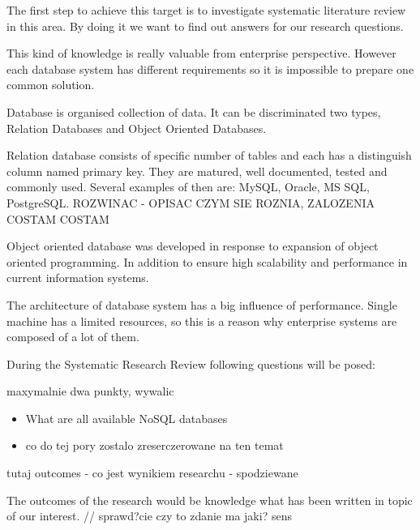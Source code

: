 \documentclass[times, 10pt,twocolumn]{article}
\begin{document}
The first step to achieve this target is to investigate systematic literature review in this area.
By doing it we want to find out answers for our research questions.

This kind of knowledge is really valuable from enterprise perspective. However each database
system has different requirements so it is impossible to prepare one common solution.
 

Database is organised collection of data. It can be discriminated two types, 
Relation Databases and Object Oriented Databases.

Relation database consists of specific number of tables and each has a distinguish column named primary key. 
They are matured, well documented, tested and commonly used. Several examples of then are: MySQL, Oracle, MS SQL, PostgreSQL. 
ROZWINAC - OPISAC CZYM SIE ROZNIA, ZALOZENIA COSTAM COSTAM 

Object oriented database was developed in response to expansion of object oriented programming. In addition to ensure high scalability and  
performance in current information systems.

The architecture of database system has a big influence of performance. Single machine has a limited
resources, so this is a reason why enterprise systems  are composed of a lot of them.



During the Systematic Research Review following questions will be posed: 

maxymalnie dwa punkty, wywalic

\begin{itemize}
  \item What are all available NoSQL databases
  \item co do tej pory zostalo zreserczerowane na ten temat 
\end{itemize}

tutaj outcomes - co jest wynikiem researchu - spodziewane

The outcomes of the research would be knowledge what has been written in topic of our interest. // sprawd?cie czy to zdanie ma jaki? sens

\end{document}
